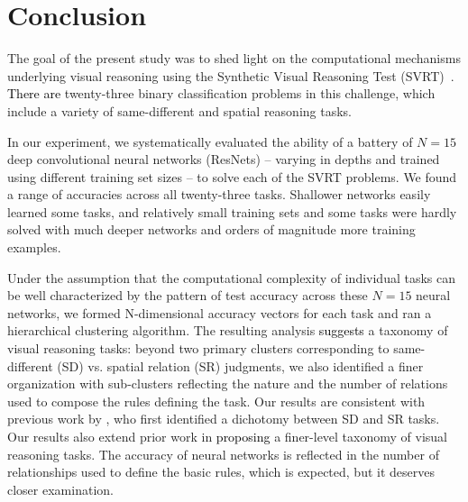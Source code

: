 \section{Conclusion}

The goal of the present study was to shed light on the computational mechanisms underlying visual reasoning using the Synthetic Visual Reasoning Test (SVRT)~\citep{fleuret2011comparing}. \textcolor{black}{There are} twenty-three binary classification problems in this challenge, which include a variety of same-different and spatial reasoning tasks.  

In our experiment, we systematically evaluated the ability of a battery of $N=15$ deep convolutional neural networks (ResNets) -- varying in depths and trained using different training set sizes -- to solve each of the SVRT problems. We found a range of accuracies across all twenty-three tasks. Shallower networks easily learned some tasks, and relatively small training sets and some tasks were hardly solved with much deeper networks and orders of magnitude more training examples. 


Under the assumption that the computational complexity of individual tasks can be well characterized by the pattern of test accuracy across these $N=15$ neural networks, we formed N-dimensional accuracy vectors for each task and ran a hierarchical clustering algorithm. The resulting analysis \textcolor{black}{suggests} a taxonomy of visual reasoning tasks: beyond two primary clusters corresponding to same-different (SD) vs. spatial relation (SR) judgments, we also identified a finer organization with sub-clusters reflecting the nature and the number of relations used to compose the rules defining the task. Our results are consistent with previous work by \citet{kim2018not}, who first identified a dichotomy between SD and SR tasks. Our results also extend prior work \citep{fleuret2011comparing,kim2018not,yihe2019program} in \textcolor{black}{proposing} a finer-level taxonomy of visual reasoning tasks. The accuracy of neural networks is reflected in the number of relationships used to define the basic rules, which is expected, but it deserves closer examination. 


